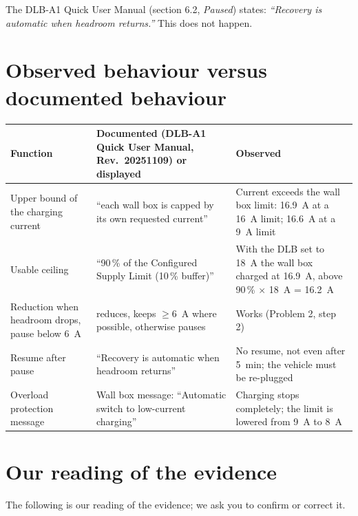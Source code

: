 \documentclass[11pt,a4paper]{article}
\begin{document}
The DLB-A1 Quick User Manual (section 6.2, \emph{Paused}) states: \emph{``Recovery is automatic when headroom returns.''} This does not happen.

\section{Observed behaviour versus documented behaviour}

\begin{longtable}{>{\raggedright\arraybackslash}p{5.0cm}>{\raggedright\arraybackslash}p{5.1cm}>{\raggedright\arraybackslash}p{5.8cm}}
\toprule
\rowcolor{aphead}\textbf{Function} & \textbf{Documented (DLB-A1 Quick User Manual, Rev.~20251109) or displayed} & \textbf{Observed} \\
\midrule\endhead
\bottomrule\endfoot
Upper bound of the charging current & ``each wall box is capped by its own requested current'' & Current exceeds the wall box limit: 16.9~A at a 16~A limit; 16.6~A at a 9~A limit \\
Usable ceiling & ``90\,\% of the Configured Supply Limit (10\,\% buffer)'' & With the DLB set to 18~A the wall box charged at 16.9~A, above 90\,\% $\times$ 18~A = 16.2~A \\
Reduction when headroom drops, pause below 6~A & reduces, keeps $\geq$6~A where possible, otherwise pauses & Works (Problem 2, step 2) \\
Resume after pause & ``Recovery is automatic when headroom returns'' & No resume, not even after 5~min; the vehicle must be re-plugged \\
Overload protection message & Wall box message: ``Automatic switch to low-current charging'' & Charging stops completely; the limit is lowered from 9~A to 8~A \\
\end{longtable}

\section{Our reading of the evidence}

The following is our reading of the evidence; we ask you to confirm or correct it.
\end{document}
